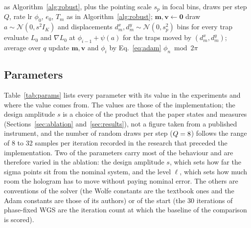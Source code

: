 \begin{algorithm}[t]
\caption{Variant with random draws, Adam and a pointing prior.}
\label{alg:sample}
\begin{algorithmic}[1]
\Require as Algorithm~\ref{alg:robust}, plus the pointing scale $s_p$ in focal bins, draws per step $Q$, rate $\mathrm{lr}$
\State $\phi_0$, $e_0$, $T_m$ as in Algorithm~\ref{alg:robust}; $\mathbf m,\mathbf v\gets\mathbf 0$
\State draw $a\sim\mathcal N(0,s^2I_K)$ and displacements $d^x_m,d^y_m\sim\mathcal N(0,s_p^2)$ bins for every trap
\State evaluate $L_0$ and $\nabla L_0$ at $\phi_{i-1}+\psi(a)$ for the traps moved by $(d^x_m,d^y_m)$; average over $q$
\EndFor
\State update $\mathbf m,\mathbf v$ and $\phi_i$ by Eq.~\eqref{eq:adam}
\EndFor
\State \Return $\phi_n\bmod2\pi$
\end{algorithmic}
\end{algorithm}

\subsection{Parameters}

Table~\ref{tab:params} lists every parameter with its value in the experiments and where the value comes from. The values are those of the implementation; the design amplitude $s$ is a choice of the product that the paper states and measures (Sections~\ref{sec:ablation} and~\ref{sec:results}), not a figure
taken from a published instrument, and the number of random draws per step ($Q=8$) follows the range of 8 to 32 samples per iteration recorded in the research that preceded the implementation. Two of the parameters carry most of the behaviour and are therefore varied in the ablation: the design amplitude $s$, which sets how far the sigma points sit from the nominal system, and the level $\ell$, which sets how much room the hologram has to move without paying nominal error. The others are conventions of the solver (the Wolfe constants are the textbook ones and the Adam constants are those of its authors) or of the start (the 30 iterations of phase-fixed WGS are the iteration count at which the baseline of the comparison is scored).

